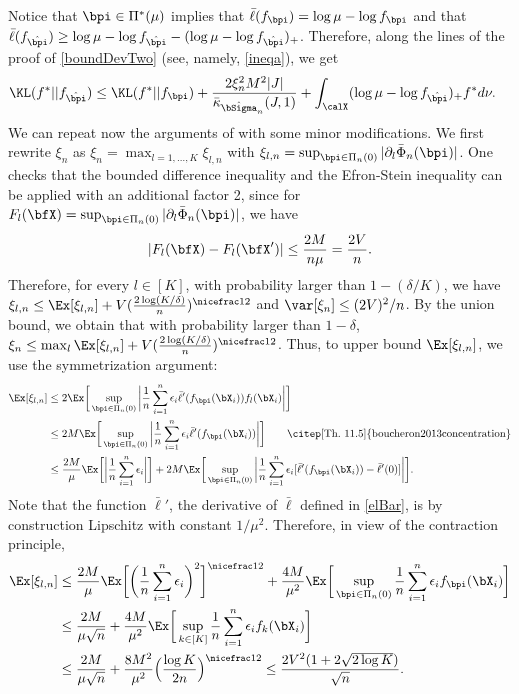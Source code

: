 Notice that $\bpi\in\Pi^*(\mu)$ implies that $\bar\ell(f_{\bpi}) = \log\mu-\log f_{\bpi}$
and that $\bar\ell(f_{\hat\bpi}) \ge  \log \mu-\log f_{\hat\bpi} -(\log\mu-\log f_{\hat\bpi})_+ $.
Therefore, along the lines of the proof of \eqref{boundDevTwo} (see, namely, \eqref{ineqa}),
we get
\begin{align}
\label{tempOraclIneqC}
\KL(f^*||f_{\hat\bpi})
    &\leq \KL(f^*||f_{\bpi}) + \frac{2\xi_n^2M^2|J|}{\bar\kappa_{\hat\bSigma_n}(J,1)}
    +\int_{\calX}(\log\mu-\log f_{\hat\bpi})_+f^*d\nu.
\end{align}
We can repeat now the arguments of  with some minor modifications. We first
rewrite $\xi_n$ as $\xi_n = \max_{l=1,\ldots,K} \xi_{l,n}$ with $\xi_{l,n} = \sup_{\bpi\in\Pi_n(0)}
|\partial_l \bar\Phi_n(\bpi)|$. One checks that the bounded difference inequality and the Efron-Stein
inequality can be applied with an additional factor 2, since for $F_l(\bfX) = \sup_{\bpi\in\Pi_n(0)}
|\partial_l \bar\Phi_n(\bpi)|$, we have
\begin{equation}
|F_l(\bfX)-F_l(\bfX')| \le \frac{2M}{n\mu} = \frac{2V}{n}.
\end{equation}
Therefore, for every $l\in[K]$, with probability larger than $1-(\delta/K)$, we have $\xi_{l,n}\le
\Ex[\xi_{l,n}]+ V(\frac{2\log(K/\delta)}{n})^{\nicefrac12}$ and $\var[\xi_n]\le (2V)^2/n$.
By the union bound, we obtain that with probability larger than $1-\delta$,
$\xi_{n}\le \max_l\Ex[\xi_{l,n}]+ V(\frac{2\log(K/\delta)}{n})^{\nicefrac12}$. Thus, to upper
bound $\Ex[\xi_{l,n}]$, we use the symmetrization argument:
\begin{align}
\Ex[\xi_{l,n}]
    & \le 2\Ex\bigg[\sup_{\bpi\in\Pi_n(0)} \bigg|\frac1n\sum_{i=1}^n \epsilon_i
            \bar\ell'(f_{\bpi}(\bX_i))f_l(\bX_i)\bigg|\bigg]\\
    &\le 2M\Ex\bigg[\sup_{\bpi\in\Pi_n(0)} \bigg|\frac1n\sum_{i=1}^n \epsilon_i
            \bar\ell'(f_{\bpi}(\bX_i))\bigg|\bigg]\qquad\text{\citep[Th.\ 11.5]{boucheron2013concentration}}\\
    &\le \frac{2M}{\mu}\Ex\bigg[\bigg|\frac1n\sum_{i=1}^n \epsilon_i\bigg|\bigg]+
        2M\Ex\bigg[\sup_{\bpi\in\Pi_n(0)} \bigg|\frac1n\sum_{i=1}^n \epsilon_i
            [\bar\ell'(f_{\bpi}(\bX_i))-\bar\ell'(0)]\bigg|\bigg].
\end{align}
Note that the function $\bar\ell'$, the derivative of $\bar\ell$ defined in \eqref{elBar},
is by construction Lipschitz with constant $1/\mu^2$. Therefore, in view of the contraction
principle,
\begin{align}
\Ex[\xi_{l,n}]
    &\le \frac{2M}{\mu}\Ex\bigg[\bigg(\frac1n\sum_{i=1}^n \epsilon_i\bigg)^2\bigg]^{\nicefrac12}+
        \frac{4M}{\mu^2}\Ex\bigg[\sup_{\bpi\in\Pi_n(0)} \frac1n\sum_{i=1}^n
        \epsilon_if_{\bpi}(\bX_i)\bigg]\\
    &\le \frac{2M}{\mu\sqrt{n}}+
        \frac{4M}{\mu^2}\Ex\bigg[\sup_{k\in[K]} \frac1n\sum_{i=1}^n
        \epsilon_i f_k(\bX_i)\bigg]\\
    &\le \frac{2M}{\mu\sqrt{n}}+
        \frac{8M^2}{\mu^2}\Big(\frac{\log K}{2n}\Big)^{\nicefrac12} \le \frac{2V^2(1+2\sqrt{2\log K})}{\sqrt{n}}.
\end{align}
